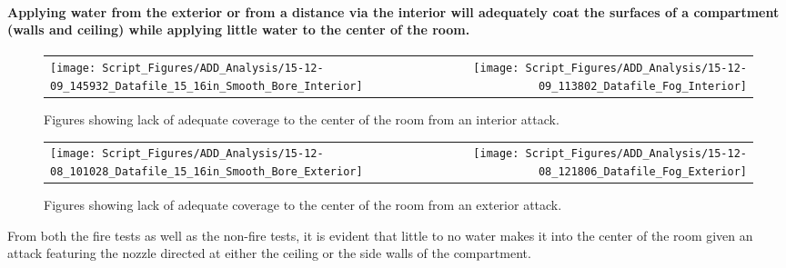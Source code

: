 \documentclass{article}
\begin{document}
\clearpage





\paragraph{Applying water from the exterior or from a distance via the interior will adequately coat the surfaces of a compartment (walls and ceiling) while applying little water to the center of the room.} \mbox{}


\begin{figure}[ht]
\begin{tabular*}{\textwidth}{lr}
\texttt{[image: Script\_Figures/ADD\_Analysis/15-12-09\_145932\_Datafile\_15\_16in\_Smooth\_Bore\_Interior]} &
\texttt{[image: Script\_Figures/ADD\_Analysis/15-12-09\_113802\_Datafile\_Fog\_Interior]} \\
\end{tabular*}
\caption{Figures showing lack of adequate coverage to the center of the room from an interior attack.}
\label{fig:Lack_of_Center_Coverage_Interior}
\end{figure}


\begin{figure}[ht]
\begin{tabular*}{\textwidth}{lr}
\texttt{[image: Script\_Figures/ADD\_Analysis/15-12-08\_101028\_Datafile\_15\_16in\_Smooth\_Bore\_Exterior]} &
\texttt{[image: Script\_Figures/ADD\_Analysis/15-12-08\_121806\_Datafile\_Fog\_Exterior]} \\
\end{tabular*}
\caption{Figures showing lack of adequate coverage to the center of the room from an exterior attack.}
\label{fig:Lack_of_Center_Coverage_Exterior}
\end{figure}

From both the fire tests as well as the non-fire tests, it is evident that little to no water makes it into the center of the room given an attack featuring the nozzle directed at either the ceiling or the side walls of the compartment.

\vspace*{\baselineskip}

\clearpage
\end{document}
